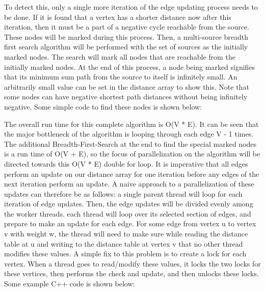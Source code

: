 \documentclass[conference]{IEEEtran}
\begin{document}
To detect this, only a single more iteration of the edge updating process needs to be done. If it is found that a vertex has a shorter distance now after this iteration, then it must be a part of a negative cycle reachable from the source. These nodes will be marked during this process. Then, a multi-source breadth first search algorithm will be performed with the set of sources as the initially marked nodes. The search will mark all nodes that are reachable from the initially marked nodes. At the end of this process, a node being marked signifies that its minimum sum path from the source to itself is infinitely small. An arbitrarily small value can be set in the distance array to show this. Note that some nodes can have negative shortest path distances without being infinitely negative. Some simple code to find these nodes is shown below:



The overall run time for this complete algorithm is O(V * E). It can be seen that the major bottleneck of the algorithm is looping through each edge V - 1 times. The additional Breadth-First-Search at the end to find the special marked nodes is a run time of O(V + E), so the focus of parallelization on the algorithm will be directed towards this O(V * E) double for loop. It is imperative that all edges perform an update on our distance array for one iteration before any edges of the next iteration perform an update. A naive approach to a parallelization of these updates can therefore be as follows: a single parent thread will loop for each iteration of edge updates. Then, the edge updates will be divided evenly among the worker threads. each thread will loop over its selected section of edges, and prepare to make an update for each edge. For some edge from vertex u to vertex v with weight w, the thread will need to make sure while reading the distance table at u and writing to the distance table at vertex v that no other thread modifies these values. A simple fix to this problem is to create a lock for each vertex. When a thread goes to read/modify these values, it locks the two locks for these vertices, then performs the check and update, and then unlocks these locks. Some example C++ code is shown below:




\end{document}
